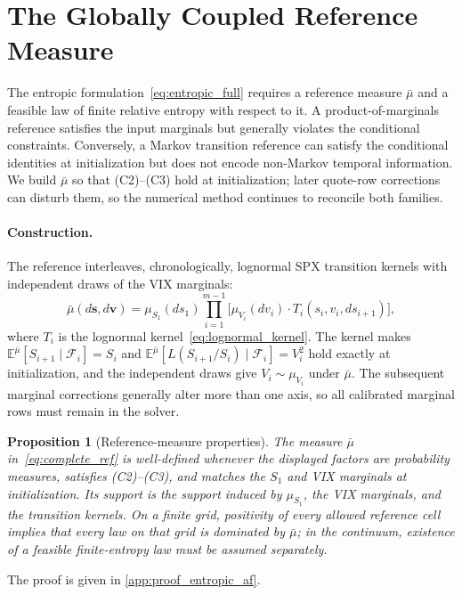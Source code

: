 \documentclass{article}
\newtheorem{proposition}{Proposition}[section]
\newcommand{\cF}{\mathcal{F}}
\newcommand{\Embb}{\mathbb{E}}
\begin{document}
\section{The Globally Coupled Reference Measure}\label{sec:reference}

The entropic formulation~\eqref{eq:entropic_full} requires a reference measure $\bar{\mu}$ and a feasible law of finite relative entropy with respect to it.
A product-of-marginals reference satisfies the input marginals but generally violates the conditional constraints.
Conversely, a Markov transition reference can satisfy the conditional identities at initialization but does not encode non-Markov temporal information.
We build $\bar\mu$ so that (C2)--(C3) hold at initialization; later quote-row corrections can disturb them, so the numerical method continues to reconcile both families.

\paragraph{Construction.} The reference interleaves, chronologically, lognormal SPX transition kernels with independent draws of the VIX marginals:
\begin{equation}\label{eq:complete_ref}
    \bar{\mu}(d\mathbf{s}, d\mathbf{v}) = \mu_{S_1}(ds_1) \prod_{i=1}^{m-1}\!\Big[\mu_{V_i}(dv_i) \cdot T_i(s_i, v_i, ds_{i+1})\Big],
\end{equation}
where $T_i$ is the lognormal kernel~\eqref{eq:lognormal_kernel}.
The kernel makes $\Embb^{\bar\mu}[S_{i+1}\mid\cF_i]=S_i$ and $\Embb^{\bar\mu}[L(S_{i+1}/S_i)\mid\cF_i]=V_i^2$ hold exactly at initialization, and the independent draws give $V_i\sim\mu_{V_i}$ under $\bar\mu$.
The subsequent marginal corrections generally alter more than one axis, so all calibrated marginal rows must remain in the solver.

\begin{proposition}[Reference-measure properties]\label{prop:ref_props}
The measure $\bar\mu$ in~\eqref{eq:complete_ref} is well-defined whenever the displayed factors are probability measures, satisfies (C2)--(C3), and matches the $S_1$ and VIX marginals at initialization.
Its support is the support induced by $\mu_{S_1}$, the VIX marginals, and the transition kernels.
On a finite grid, positivity of every allowed reference cell implies that every law on that grid is dominated by $\bar\mu$; in the continuum, existence of a feasible finite-entropy law must be assumed separately.
\end{proposition}
The proof is given in \cref{app:proof_entropic_af}.
\end{document}
